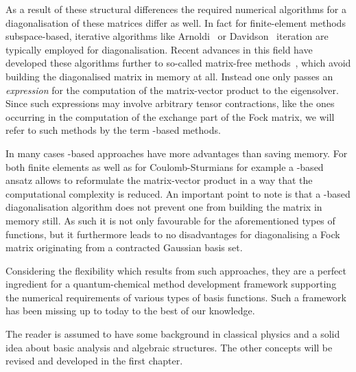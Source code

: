 As a result of these structural differences
the required numerical algorithms for a
diagonalisation of these matrices differ as well.
In fact for finite-element methods subspace-based, iterative
algorithms like Arnoldi~\cite{Arnoldi1951} or Davidson~\cite{Davidson1975}
iteration are typically employed for diagonalisation.
Recent advances in this field have developed these algorithms
further to so-called matrix-free methods~\cite{Kronbichler2012},
which avoid building the diagonalised matrix in memory at all.
Instead one only passes an \emph{expression} for the
computation of the matrix-vector product to the eigensolver.
Since such expressions may involve arbitrary tensor contractions,
like the ones occurring in the computation of the
exchange part of the Fock matrix,
we will refer to such methods
by the term \contraction-based methods.

In many cases \contraction-based approaches
have more advantages than saving memory.
For both finite elements as well as for Coulomb-Sturmians
for example a \contraction-based ansatz
allows to reformulate the matrix-vector product in a way
that the computational complexity is reduced.
An important point to note is that
a \contraction-based diagonalisation algorithm
does not prevent one from building the matrix in memory still.
As such it is not only favourable for the aforementioned
types of functions,
but it furthermore leads to no disadvantages
for diagonalising a Fock matrix originating from
a contracted Gaussian basis set.

Considering the flexibility which results from such approaches,
they are a perfect ingredient for
a quantum-chemical method development framework
supporting the numerical requirements of various types of basis functions.
Such a framework has been missing up to today to the best of our knowledge.

The reader is assumed to have some background in classical physics
and a solid idea about basic analysis and algebraic structures.
The other concepts will be revised and developed in the first chapter.

